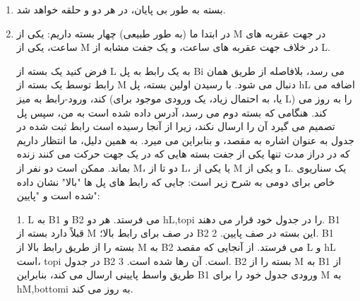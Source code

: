 \begin{boxK}
    \begin{enumerate}
        \item 
    بسته به طور بی پایان، در هر دو 
    و
    حلقه
    خواهد شد.

    \item 
    در ابتدا ما (به طور طبیعی) چهار بسته داریم:
  یکی از M در جهت عقربه های ساعت،
  یکی از M در خلاف جهت عقربه های ساعت،
و یک جفت مشابه از L.


فرض کنید یک بسته از L به یک رابط به پل Bi می رسد،
بلافاصله از طریق همان رابط توسط یک بسته از M دنبال می شود.
با رسیدن اولین بسته،
پل hL اضافه می کند،
ورود-رابط به میز (یا، به احتمال زیاد،
یک ورودی موجود برای L) را به روز می کند.
هنگامی که بسته دوم می رسد، آدرس داده شده است
به من،
سپس پل تصمیم می گیرد آن را ارسال نکند، زیرا از آنجا رسیده است
رابط ثبت شده در جدول به عنوان اشاره به مقصد، و بنابراین می میرد.
به همین دلیل، ما انتظار داریم که در دراز مدت تنها یکی از جفت بسته هایی که در یک جهت حرکت می کنند زنده بماند.
ممکن است دو نفر از M، دو تا از L،
  یا یکی از M و یکی از L.
یک سناریوی خاص برای دومی به شرح زیر است:
  جایی که رابط های پل ها "بالا" نشان داده شده است
و "پایین":

1.
L به B1 و B2 می فرستد. هر دو hL,topi را در جدول خود قرار می دهند. B1 قبلاً دارد
بسته از M در صف برای رابط بالا؛
  B2 این بسته در صف پایین.
2. 
B1 بسته را از طریق رابط بالا از M به B2 می فرستد.
از آنجایی که مقصد L و hL است، topi در جدول B2 است.
  آن رها شده است.
3.
B2 بسته را از M به B1 از طریق واسط پایینی ارسال می کند، بنابراین B1 ورودی جدول خود را برای M به hM,bottomi به روز می کند.    

    \end{enumerate}
\end{boxK}